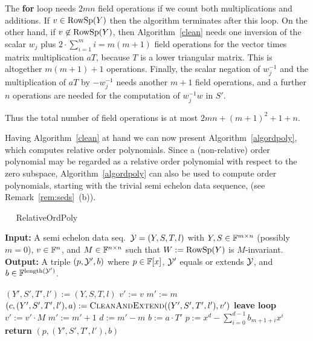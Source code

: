 The \textbf{for} loop needs $2mn$ field operations if we count both multiplications
and additions. If $v\in\mathrm{RowSp}(Y)$ then the algorithm terminates after this loop.
On the other hand, if  $v\not\in\mathrm{RowSp}(Y)$, then 
Algorithm~\ref{clean} needs one inversion
of the scalar $w_j$ plus $2 \cdot \sum_{i=1}^m i = m(m+1)$
field operations for the vector times matrix multiplication
$aT$, because $T$ is a lower triangular matrix. This is altogether $m(m+1)+1$ operations. 
Finally, the scalar negation of $w_j^{-1}$ and the multiplication of $aT$ by 
$-w_j^{-1}$ needs another $m+1$ field operations, and a further $n$ operations 
are needed for the computation of $w_j^{-1} w$ in $S'$. 

Thus the
total number of field operations is at most $2mn + (m+1)^2 + 1 + n$.
\proofend

\smallskip
Having Algorithm~\ref{clean} at hand we can now present
Algorithm~\ref{algordpoly}, which computes relative order polynomials.
Since a (non-relative) order polynomial may be regarded as a relative order
polynomial with respect to the zero subspace, Algorithm~\ref{algordpoly}
can also be used to compute order polynomials, starting with the trivial semi
echelon data sequence, (see Remark~\ref{rem:seds}~(b)).

\begin{algorithm}
\caption{$\quad$ \sc RelativeOrdPoly}
\label{algordpoly}
\begin{algorithmic}
\STATE \textbf{Input:} A semi echelon data seq.~$\mathcal{Y}=(Y,S,T,l)$ with 
$Y,S \in \mathbb{F}^{m \times n}$ (possibly $m=0$),
\STATE \hspace*{0mm} %
$v \in \mathbb{F}^n$, 
and $M \in \mathbb{F}^{n \times n}$ such that $W:=\mathrm{RowSp}(Y)$ is $M$-invariant.
\STATE \textbf{Output:} A triple $(p,\mathcal{Y}',b)$ where $p\in\mathbb{F}[x]$, 
$\mathcal{Y}'$ equals or 
extends $\mathcal{Y}$, 
and $b\in\mathbb{F}^{\mathrm{length}(\mathcal{Y}')}$.

\vspace*{2mm}
\STATE $(Y',S',T',l') := (Y,S,T,l)$ \hspace*{5mm}
\STATE $v' := v$
\STATE $m' := m$ \hspace*{3.5cm}  
\LOOP
    \STATE $(c,(Y',S',T',l'),a) := \mbox{\sc CleanAndExtend}((Y',S',T',l'),v')$  \hspace*{5mm} 
        \STATE \textbf{leave loop}
    \ENDIF
    \STATE $v' := v' \cdot M$
     \STATE $m' := m' +1$	
\ENDLOOP \hspace*{3.5cm}  
\STATE $d := m'-m$
\STATE $b := a\cdot T'$
\STATE $p :=x^d-\sum_{i=0}^{d-1} b_{m+1+i} x^i$
\STATE \textbf{return} $(p, (Y',S',T',l'),b)$
\end{algorithmic}
\end{algorithm}


